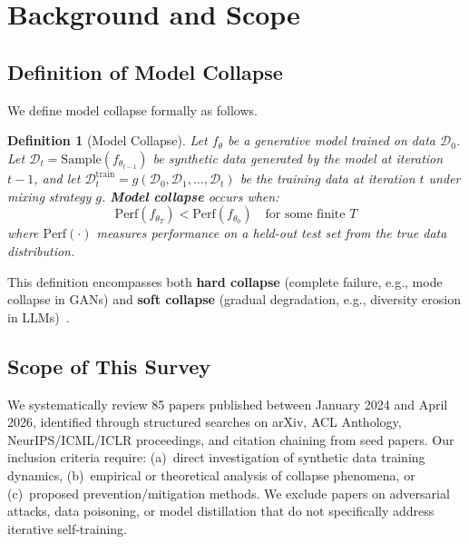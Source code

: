 \documentclass[11pt]{article}
\newtheorem{definition}{Definition}
\newcommand{\cD}{\mathcal{D}}
\begin{document}
\section{Background and Scope}
\label{sec:background}

\subsection{Definition of Model Collapse}

We define model collapse formally as follows.

\begin{definition}[Model Collapse]
\label{def:collapse}
Let $f_\theta$ be a generative model trained on data $\cD_0$. Let $\cD_t = \mathrm{Sample}(f_{\theta_{t-1}})$ be synthetic data generated by the model at iteration $t{-}1$, and let $\cD_t^{\mathrm{train}} = g(\cD_0, \cD_1, \ldots, \cD_t)$ be the training data at iteration $t$ under mixing strategy $g$. \textbf{Model collapse} occurs when:
\begin{equation}
    \mathrm{Perf}(f_{\theta_T}) < \mathrm{Perf}(f_{\theta_0}) \quad \text{for some finite } T
\end{equation}
where $\mathrm{Perf}(\cdot)$ measures performance on a held-out test set from the true data distribution.
\end{definition}

This definition encompasses both \textbf{hard collapse} (complete failure, e.g., mode collapse in GANs) and \textbf{soft collapse} (gradual degradation, e.g., diversity erosion in LLMs)~\citep{holtzman2020neural}.

\subsection{Scope of This Survey}

We systematically review 85 papers published between January 2024 and April 2026, identified through structured searches on arXiv, ACL Anthology, NeurIPS/ICML/ICLR proceedings, and citation chaining from seed papers. Our inclusion criteria require: (a)~direct investigation of synthetic data training dynamics, (b)~empirical or theoretical analysis of collapse phenomena, or (c)~proposed prevention/mitigation methods. We exclude papers on adversarial attacks, data poisoning, or model distillation that do not specifically address iterative self-training.

\end{document}
